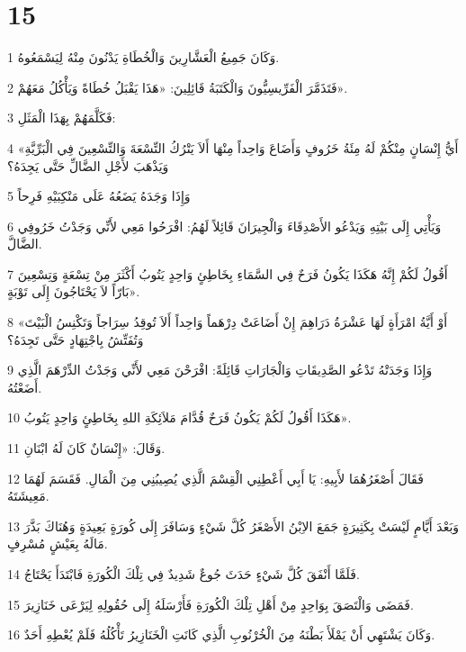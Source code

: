 \chapter{15}

\par 1 وَكَانَ جَمِيعُ الْعَشَّارِينَ وَالْخُطَاةِ يَدْنُونَ مِنْهُ لِيَسْمَعُوهُ.
\par 2 فَتَذَمَّرَ الْفَرِّيسِيُّونَ وَالْكَتَبَةُ قَائِلِينَ: «هَذَا يَقْبَلُ خُطَاةً وَيَأْكُلُ مَعَهُمْ».
\par 3 فَكَلَّمَهُمْ بِهَذَا الْمَثَلِ:
\par 4 «أَيُّ إِنْسَانٍ مِنْكُمْ لَهُ مِئَةُ خَرُوفٍ وَأَضَاعَ وَاحِداً مِنْهَا أَلاَ يَتْرُكُ التِّسْعَةَ وَالتِّسْعِينَ فِي الْبَرِّيَّةِ وَيَذْهَبَ لأَجْلِ الضَّالِّ حَتَّى يَجِدَهُ؟
\par 5 وَإِذَا وَجَدَهُ يَضَعُهُ عَلَى مَنْكِبَيْهِ فَرِحاً
\par 6 وَيَأْتِي إِلَى بَيْتِهِ وَيَدْعُو الأَصْدِقَاءَ وَالْجِيرَانَ قَائِلاً لَهُمُ: افْرَحُوا مَعِي لأَنِّي وَجَدْتُ خَرُوفِي الضَّالَّ.
\par 7 أَقُولُ لَكُمْ إِنَّهُ هَكَذَا يَكُونُ فَرَحٌ فِي السَّمَاءِ بِخَاطِئٍ وَاحِدٍ يَتُوبُ أَكْثَرَ مِنْ تِسْعَةٍ وَتِسْعِينَ بَارّاً لاَ يَحْتَاجُونَ إِلَى تَوْبَةٍ».
\par 8 «أَوْ أَيَّةُ امْرَأَةٍ لَهَا عَشْرَةُ دَرَاهِمَ إِنْ أَضَاعَتْ دِرْهَماً وَاحِداً أَلاَ تُوقِدُ سِرَاجاً وَتَكْنِسُ الْبَيْتَ وَتُفَتِّشُ بِاجْتِهَادٍ حَتَّى تَجِدَهُ؟
\par 9 وَإِذَا وَجَدَتْهُ تَدْعُو الصَّدِيقَاتِ وَالْجَارَاتِ قَائِلَةً: افْرَحْنَ مَعِي لأَنِّي وَجَدْتُ الدِّرْهَمَ الَّذِي أَضَعْتُهُ.
\par 10 هَكَذَا أَقُولُ لَكُمْ يَكُونُ فَرَحٌ قُدَّامَ مَلاَئِكَةِ اللهِ بِخَاطِئٍ وَاحِدٍ يَتُوبُ».
\par 11 وَقَالَ: «إِنْسَانٌ كَانَ لَهُ ابْنَانِ.
\par 12 فَقَالَ أَصْغَرُهُمَا لأَبِيهِ: يَا أَبِي أَعْطِنِي الْقِسْمَ الَّذِي يُصِيبُنِي مِنَ الْمَالِ. فَقَسَمَ لَهُمَا مَعِيشَتَهُ.
\par 13 وَبَعْدَ أَيَّامٍ لَيْسَتْ بِكَثِيرَةٍ جَمَعَ الاِبْنُ الأَصْغَرُ كُلَّ شَيْءٍ وَسَافَرَ إِلَى كُورَةٍ بَعِيدَةٍ وَهُنَاكَ بَذَّرَ مَالَهُ بِعَيْشٍ مُسْرِفٍ.
\par 14 فَلَمَّا أَنْفَقَ كُلَّ شَيْءٍ حَدَثَ جُوعٌ شَدِيدٌ فِي تِلْكَ الْكُورَةِ فَابْتَدَأَ يَحْتَاجُ.
\par 15 فَمَضَى وَالْتَصَقَ بِوَاحِدٍ مِنْ أَهْلِ تِلْكَ الْكُورَةِ فَأَرْسَلَهُ إِلَى حُقُولِهِ لِيَرْعَى خَنَازِيرَ.
\par 16 وَكَانَ يَشْتَهِي أَنْ يَمْلَأَ بَطْنَهُ مِنَ الْخُرْنُوبِ الَّذِي كَانَتِ الْخَنَازِيرُ تَأْكُلُهُ فَلَمْ يُعْطِهِ أَحَدٌ.
